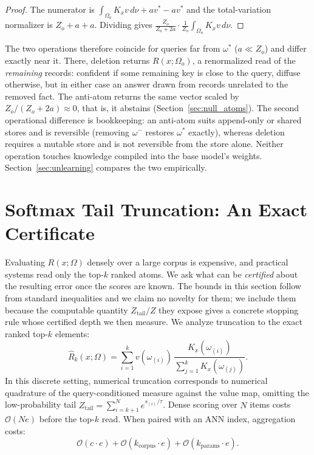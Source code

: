 \documentclass[preprint,12pt]{elsarticle}
\newcommand{\Om}{\Omega}
\newif\ifmarkchanges
\newcommand{\rev}[1]{\ifmarkchanges{\color{blue}#1}\else#1\fi}
\begin{document}
\begin{proof}
\rev{The numerator is $\int_{\Om_o}K_x v\,d\nu+a v^*-a v^*$ and the total-variation normalizer is $Z_o+a+a$. Dividing gives $\frac{Z_o}{Z_o+2a}\cdot\frac{1}{Z_o}\int_{\Om_o}K_x v\,d\nu$.} \qedhere
\end{proof}

\rev{The two operations therefore coincide for queries far from $\omega^*$ ($a\ll Z_o$) and differ exactly near it. There, deletion returns $R(x;\Om_o)$, a renormalized read of the \emph{remaining} records: confident if some remaining key is close to the query, diffuse otherwise, but in either case an answer drawn from records unrelated to the removed fact. The anti-atom returns the same vector scaled by $Z_o/(Z_o+2a)\approx0$, that is, it abstains (Section~\ref{sec:null_atoms}). The second operational difference is bookkeeping: an anti-atom suits append-only or shared stores and is reversible (removing $\omega^-$ restores $\omega^*$ exactly), whereas deletion requires a mutable store and is not reversible from the store alone. Neither operation touches knowledge compiled into the base model's weights. Section~\ref{sec:unlearning} compares the two empirically.}

\section{Softmax Tail Truncation: An Exact Certificate}
\label{sec:quadrature}

Evaluating $R(x; \Om)$ densely over a large corpus is expensive, and practical systems read only the top-$k$ ranked atoms. We ask what can be \emph{certified} about the resulting error once the scores are known. \rev{The bounds in this section follow from standard inequalities and we claim no novelty for them; we include them because the computable quantity $Z_{\mathrm{tail}}/Z$ they expose gives a concrete stopping rule whose certified depth we then measure.} We analyze truncation to the exact ranked top-$k$ elements:
\[
  \hat{R}_k(x; \Om) = \sum_{i=1}^k v(\omega_{(i)})\, \frac{K_x(\omega_{(i)})}{\sum_{j=1}^k K_x(\omega_{(j)})}.
\]
In this discrete setting, numerical truncation corresponds to numerical quadrature of the query-conditioned measure against the value map, omitting the low-probability tail $Z_{\mathrm{tail}} = \sum_{i=k+1}^N e^{s_{(i)}/\tau}$. Dense scoring over $N$ items costs $\mathcal{O}(Ne)$ before the top-$k$ read. When paired with an ANN index, aggregation costs:
\[
  \mathcal{O}(c \cdot e) + \mathcal{O}(k_{\mathrm{corpus}} \cdot e) + \mathcal{O}(k_{\mathrm{params}} \cdot e).
\]
\end{document}
